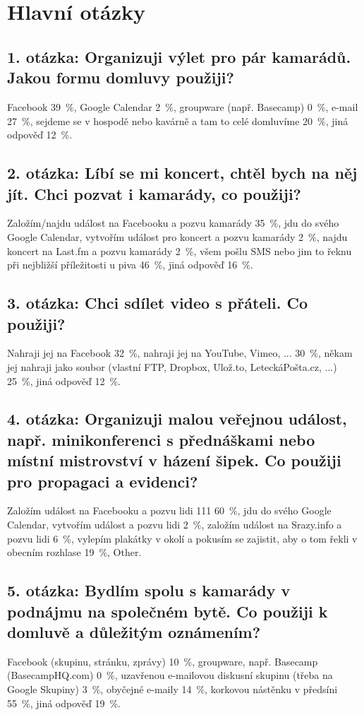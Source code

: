 \documentclass[12pt,oneside,final]{fithesis2}
\begin{document}
\section{Hlavní otázky}

\subsection*{1. otázka: Organizuji výlet pro pár kamarádů. Jakou formu domluvy použiji?}
Facebook 39~\%,
Google Calendar 2~\%,
groupware (např. Basecamp) 0~\%,
e-mail 27~\%,
sejdeme se v hospodě nebo kavárně a tam to celé domluvíme 20~\%,
jiná odpověď 12~\%.

\subsection*{2. otázka: Líbí se mi koncert, chtěl bych na něj jít. Chci pozvat i kamarády, co použiji?}
Založím/najdu událost na Facebooku a pozvu kamarády 35~\%,
jdu do svého Google Calendar, vytvořím událost pro koncert a pozvu kamarády  2~\%,
najdu koncert na Last.fm a pozvu kamarády  2~\%,
všem pošlu SMS nebo jim to řeknu při nejbližší příležitosti u piva 46~\%,
jiná odpověď 16~\%.

\subsection*{3. otázka: Chci sdílet video s přáteli. Co použiji?}
Nahraji jej na Facebook 32~\%,
nahraji jej na YouTube, Vimeo, ... 30~\%,
někam jej nahraji jako soubor (vlastní FTP, Dropbox, Ulož.to, LeteckáPošta.cz, ...) 25~\%,
jiná odpověď 12~\%.

\subsection*{4. otázka: Organizuji malou veřejnou událost, např. minikonferenci s přednáškami nebo místní mistrovství v házení šipek. Co použiji pro propagaci a evidenci?}
Založím událost na Facebooku a pozvu lidi 111 60~\%,
jdu do svého Google Calendar, vytvořím událost a pozvu lidi 2~\%,
založím událost na Srazy.info a pozvu lidi 6~\%,
vylepím plakátky v okolí a pokusím se zajistit, aby o tom řekli v obecním rozhlase 19~\%,
Other.

\subsection*{5. otázka: Bydlím spolu s kamarády v podnájmu na společném bytě. Co použiji k domluvě a důležitým oznámením?}
Facebook (skupinu, stránku, zprávy) 10~\%,
groupware, např. Basecamp (BasecampHQ.com) 0~\%,
uzavřenou e-mailovou diskusní skupinu (třeba na Google Skupiny) 3~\%,
obyčejné e-maily 14~\%,
korkovou nástěnku v předsíni 55~\%,
jiná odpověď 19~\%.
\end{document}
